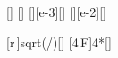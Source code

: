 [\newton\meter\squared\per\coulomb\squared]
[\coulomb]
[\milli\newton][e-3][\newton]
[\centi\meter][e-2][\meter]

[r\,]{\rsX*sqrt(\FX/\kCX)}[\coulomb]
[4\,F]{4*\FX}[\newton]
